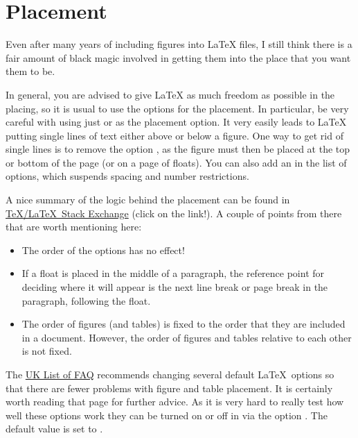 \section{Placement}%
\label{sec:fig:placement}

Even after many years of including figures into \LaTeX{} files, I
still think there is a fair amount of black magic involved in getting
them into the place that you want them to be.

In general, you are advised to give \LaTeX{} as much freedom as
possible in the placing, so it is usual to use the options
\Option{[htbp]} for the placement. In particular, be very careful with
using just \Option{[h]} or \Option{[H]} as the placement option. It very
easily leads to \LaTeX{} putting single lines of text either above or
below a figure.
One way to get rid of single lines is to remove the option ,
as the figure must then be placed at the top or bottom of the page
(or on a page of floats).
You can also add an \Option{!} in the list
of options, which suspends spacing and number restrictions.

A nice summary of the logic behind the placement can be found in
\href{http://tex.stackexchange.com/questions/39017/how-to-influence-the-position-of-float-environments-like-figure-and-table-in-lat}{\TeX/\LaTeX\ Stack Exchange} (click on the link!).
A couple of points from there that are worth mentioning here:
\begin{itemize}
\item The order of the options  has no effect!
\item If a float is placed in the middle of a paragraph,
  the reference point for deciding where it will appear is the next line break or page break in the paragraph,
  following the float.
\item The order of figures (and tables) is fixed to the order that they are included in a document.
  However, the order of figures and tables relative to each other is not fixed.
\end{itemize}

The
\href{http://www.tex.ac.uk/cgi-bin/texfaq2html?label=floats}{UK List of FAQ}
recommends changing several default \LaTeX\ options so that there are fewer problems
with figure and table placement.
It is certainly worth reading that page for further advice.
As it is very hard to really test how well these options work
they can be turned on or off in  via the option .
The default value is set to .

